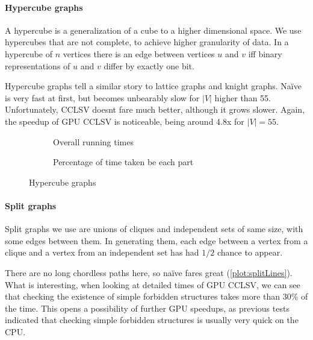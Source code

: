 \paragraph{Hypercube graphs}

A hypercube is a generalization of a cube to a higher dimensional space. We use hypercubes that are not complete, to achieve higher granularity of data. In a hypercube of $n$ vertices there is an edge between vertices $u$ and $v$ iff binary representations of $u$ and $v$ differ by exactly one bit.

Hypercube graphs tell a similar story to lattice graphs and knight graphs. Na\"ive is very fast at first, but becomes unbearably slow for $|V|$ higher than 55. Unfortunately, CCLSV doesnt fare much better, although it grows slower. Again, the speedup of GPU CCLSV is noticeable, being around 4.8x for $|V| = 55$.

\begin{figure}
  \begin{subfigure}{\textwidth}
    \centering
    
    \caption{Overall running times}
    \label{plot:hypercubeLines}
  \end{subfigure}

  \begin{subfigure}{\textwidth}
    \centering
    
    \caption{Percentage of time taken be each part}
    \label{plot:hypercubeDet}
  \end{subfigure}
  \caption{Hypercube graphs}
\end{figure}

\paragraph{Split graphs}

Split graphs we use are unions of cliques and independent sets of same size, with some edges between them. In generating them, each edge between a vertex from a clique and a vertex from an independent set has had $1/2$ chance to appear.

There are no long chordless paths here, so na\"ive fares great (\cref{plot:splitLines}). What is interesting, when looking at detailed times of GPU CCLSV, we can see that checking the existence of simple forbidden structures takes more than 30\% of the time. This opens a possibility of further GPU speedups, as previous tests indicated that checking simple forbidden structures is usually very quick on the CPU.

